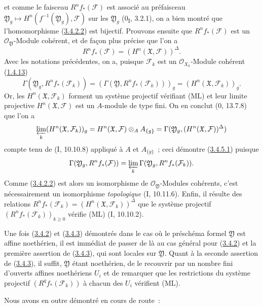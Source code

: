 \begin{env}[3.4.5]
et comme le faisceau $R^nf_*(\mathcal F)$ est associé au préfaisceau
$\mathfrak Y_g\mapsto H^n(f^{-1}(\mathfrak Y_g),\mathcal F)$ sur les
$\mathfrak Y_g$ (0\textsubscript{I}, 3.2.1), on a bien montré que
l'homomorphisme (\hyperref[III.3.4.2.2-fr]{3.4.2.2}) est bijectif. Prouvons
ensuite que $R^nf_*(\mathcal F)$ est un $\mathcal O_{\mathfrak Y}$-Module
cohérent, et de façon plus précise que l'on a
\[
R^nf_*(\mathcal F)=(H^n(\mathfrak X,\mathcal F))^\Delta.
\tag{3.4.5.1}\label{III.3.4.5.1-fr}
\]
Avec les notations précédentes, on a, puisque $\mathcal F_k$ est un
$\mathcal O_{X_k}$-Module cohérent (\hyperref[III.1.4.13-fr]{1.4.13})
\[
\Gamma(\mathfrak Y_g,R^nf_*(\mathcal F_k))
=(\Gamma(\mathfrak Y,R^nf_*(\mathcal F_k)))_g
=(H^n(\mathfrak X,\mathcal F_k))_g.
\]
Or, les $H^n(\mathfrak X,\mathcal F_k)$ forment un système projectif
vérifiant (ML) et leur limite projective $H^n(\mathfrak X,\mathcal F)$ est
un $A$-module de type fini. On en conclut (0, 13.7.8) que l'on a
\[
\varprojlim_k(H^n(\mathfrak X,\mathcal F_k))_g
=H^n(\mathfrak X,\mathcal F)\otimes_AA_{\{g\}}
=\Gamma(\mathfrak Y_g,(H^n(\mathfrak X,\mathcal F))^\Delta)
\]
compte tenu de (I, 10.10.8) appliqué à $A$ et $A_{\{g\}}$~; ceci démontre
(\hyperref[III.3.4.5.1-fr]{3.4.5.1}) puisque
\[
\Gamma(\mathfrak Y_g,R^nf_*(\mathcal F))
=\varprojlim_k\Gamma(\mathfrak Y_g,R^nf_*(\mathcal F_k)).
\]
Comme (\hyperref[III.3.4.2.2-fr]{3.4.2.2}) est alors un isomorphisme de
$\mathcal O_{\mathfrak Y}$-Modules cohérents, c'est nécessairement un
isomorphisme \emph{topologique} (I, 10.11.6). Enfin, il résulte des relations
$R^nf_*(\mathcal F_k)=(H^n(\mathfrak X,\mathcal F_k))^\Delta$ que le système
projectif $(R^nf_*(\mathcal F_k))_{k\geq0}$ vérifie (ML) (I, 10.10.2).

Une fois (\hyperref[III.3.4.2-fr]{3.4.2}) et
(\hyperref[III.3.4.3-fr]{3.4.3}) démontrés dans le cas où le préschéma formel
$\mathfrak Y$ est affine noethérien, il est immédiat de passer de là au cas
général pour (\hyperref[III.3.4.2-fr]{3.4.2}) et la première assertion de
(\hyperref[III.3.4.3-fr]{3.4.3}), qui sont locales sur $\mathfrak Y$. Quant à
la seconde assertion de (\hyperref[III.3.4.3-fr]{3.4.3}), il suffit,
$\mathfrak Y$ étant noethérien, de le recouvrir par un nombre fini d'ouverts
affines noethériens $U_i$ et de remarquer que les restrictions du système
projectif $(R^qf_*(\mathcal F_k))$ à chacun des $U_i$ vérifient (ML).
\end{env}

Nous avons en outre démontré en cours de route~:


